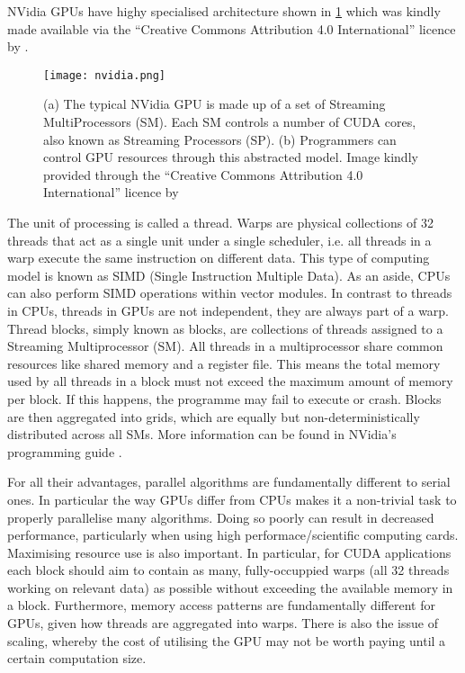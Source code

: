 NVidia GPUs have highy specialised architecture shown in \cref{gpuarch} which was kindly made available via the ``Creative Commons Attribution 4.0 International'' licence by \citeauthor{gpuarch}.
\begin{figure}
    \centering
    \texttt{[image: nvidia.png]}
    \caption{(a) The typical NVidia GPU is made up of a set of Streaming MultiProcessors (SM). Each SM controls a number of CUDA cores, also known as Streaming Processors (SP). (b) Programmers can control GPU resources through this abstracted model. Image kindly provided through the ``Creative Commons Attribution 4.0 International'' licence by \cite{gpuarch}}
    \label{gpuarch}
\end{figure}
The unit of processing is called a thread. Warps are physical collections of 32 threads that act as a single unit under a single scheduler, i.e. all threads in a warp execute the same instruction on different data. This type of computing model is known as SIMD (Single Instruction Multiple Data). As an aside, CPUs can also perform SIMD operations within vector modules. In contrast to threads in CPUs,
threads in GPUs are not independent, they are always part of a warp. Thread blocks, simply known as blocks, are collections of threads assigned to a Streaming Multiprocessor (SM). All threads in a multiprocessor share common resources like shared memory and a register file. This means the total memory used by all threads in a block must not exceed the maximum amount of memory per block. If this happens, the programme may fail to execute or crash. Blocks are then aggregated into grids, which are equally but non-deterministically distributed across all SMs. More information can be found in NVidia's programming guide \cite{nvidia}.

For all their advantages, parallel algorithms are fundamentally different to serial ones. In particular the way GPUs differ from CPUs makes it a non-trivial task to properly parallelise many algorithms. Doing so poorly can result in decreased performance, particularly when using high performace/scientific computing cards. Maximising resource use is also important. In particular, for CUDA applications each block should aim to contain as many, fully-occuppied warps (all 32 threads working on relevant data) as possible without exceeding the available memory in a block. Furthermore, memory access patterns are fundamentally different for GPUs, given how threads are aggregated into warps. There is also the issue of scaling, whereby the cost of utilising the GPU may not be worth paying until a certain computation size.

